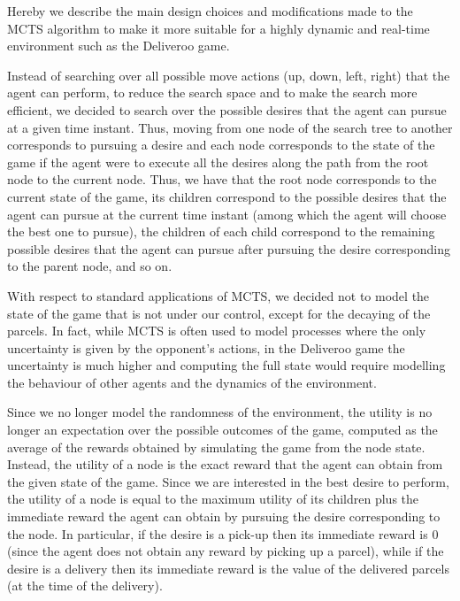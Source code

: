 Hereby we describe the main design choices and modifications made to the MCTS algorithm to make it more suitable for a highly dynamic and real-time environment such as the Deliveroo game.

Instead of searching over all possible move actions (up, down, left, right) that the agent can perform, to reduce the search space and to make the search more efficient, we decided to search over the possible desires that the agent can pursue at a given time instant. Thus, moving from one node of the search tree to another corresponds to pursuing a desire and each node corresponds to the state of the game if the agent were to execute all the desires along the path from the root node to the current node. Thus, we have that the root node corresponds to the current state of the game, its children correspond to the possible desires that the agent can pursue at the current time instant (among which the agent will choose the best one to pursue), the children of each child correspond to the remaining possible desires that the agent can pursue after pursuing the desire corresponding to the parent node, and so on.

With respect to standard applications of MCTS, we decided not to model the state of the game that is not under our control, except for the decaying of the parcels. In fact, while MCTS is often used to model processes where the only uncertainty is given by the opponent's actions, in the Deliveroo game the uncertainty is much higher and computing the full state would require modelling the behaviour of other agents and the dynamics of the environment.

Since we no longer model the randomness of the environment, the utility is no longer an expectation over the possible outcomes of the game, computed as the average of the rewards obtained by simulating the game from the node state. Instead, the utility of a node is the exact reward that the agent can obtain from the given state of the game. Since we are interested in the best desire to perform, the utility of a node is equal to the maximum utility of its children plus the immediate reward the agent can obtain by pursuing the desire corresponding to the node. In particular, if the desire is a pick-up then its immediate reward is 0 (since the agent does not obtain any reward by picking up a parcel), while if the desire is a delivery then its immediate reward is the value of the delivered parcels (at the time of the delivery).


